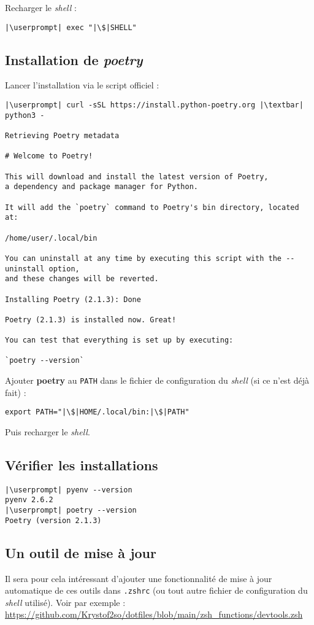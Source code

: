 Recharger le \textit{shell} :
\begin{lstlisting}[style=bash]
|\userprompt| exec "|\$|SHELL"
\end{lstlisting}

\subsection*{Installation de \textit{poetry}}
Lancer l’installation via le script officiel :
\begin{lstlisting}[style=bash]
|\userprompt| curl -sSL https://install.python-poetry.org |\textbar| python3 -

Retrieving Poetry metadata

# Welcome to Poetry!

This will download and install the latest version of Poetry,
a dependency and package manager for Python.

It will add the `poetry` command to Poetry's bin directory, located at:

/home/user/.local/bin

You can uninstall at any time by executing this script with the --uninstall option,
and these changes will be reverted.

Installing Poetry (2.1.3): Done

Poetry (2.1.3) is installed now. Great!

You can test that everything is set up by executing:

`poetry --version`
\end{lstlisting}

Ajouter \textbf{poetry} au \texttt{PATH} dans le fichier de configuration du \textit{shell} (si ce n'est déjà fait) :
\begin{lstlisting}[style=file]
export PATH="|\$|HOME/.local/bin:|\$|PATH"
\end{lstlisting}

Puis recharger le \textit{shell}.

\subsection*{Vérifier les installations}
\begin{lstlisting}[style=bash]
|\userprompt| pyenv --version
pyenv 2.6.2
|\userprompt| poetry --version
Poetry (version 2.1.3)
\end{lstlisting}

\subsection*{Un outil de mise à jour}
Il sera pour cela intéressant d'ajouter une fonctionnalité de mise à jour automatique de ces outils dans \texttt{.zshrc} (ou tout autre fichier de configuration du \textit{shell} utilisé). Voir par exemple : \url{https://github.com/Krystof2so/dotfiles/blob/main/zsh_functions/devtools.zsh} 

